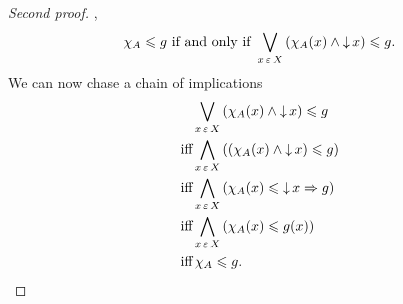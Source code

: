 \documentclass{../thesis-note}
\DeclareMathOperator\dset{\downarrow}
\begin{document}
\begin{proof}[Second proof]
  \Omega\),
  \[%
    \chi_A \leq g \text{ if and only if } \bigvee_{x \in X} \pwrap{\chi_A(x)
      \wedge \dset x} \leq g.
  \]%
  We can now chase a chain of implications
  \begin{align*}
    & \bigvee_{x \in X} \pwrap{\chi_A(x) \wedge \dset x} \leq g \\
    \text{iff} & \bigwedge_{x \in X} \pwrap{ \pwrap{\chi_A(x) \wedge \dset x}
      \leq g }\\
    \text{iff} & \bigwedge_{x \in X} \pwrap{\chi_A(x) \leq \dset x \Rightarrow
      g}\\
    \text{iff} & \bigwedge_{x \in X} \pwrap{\chi_A(x) \leq g(x)}\\
    \text{iff} & \,\chi_A \leq g.
  \end{align*}
\end{proof}
\end{document}
